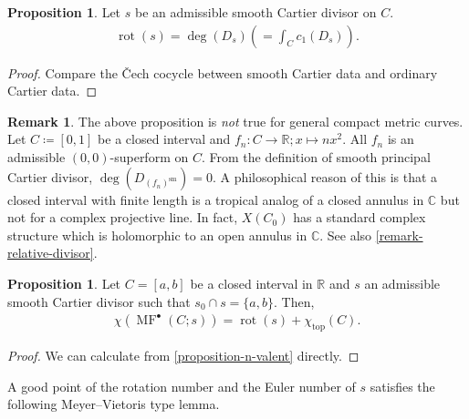 \documentclass[a4paper,dvipdfmx,reqno,12pt]{amsart}
\theoremstyle{definition}
\newtheorem{proposition}[theorem]{Proposition}
\newtheorem{remark}[theorem]{Remark}
\newcommand{\deq}{\coloneqq}
\newcommand{\opn}[1]{\operatorname{#1}}
\numberwithin{equation}{section}
\begin{document}
\begin{proposition}
Let $s$ be an admissible smooth Cartier divisor on $C$.
\label{equation-rotation-number}
\begin{align}
\opn{rot}(s)=\opn{deg}(D_s)(=\int_{C} c_1(D_s)).
\end{align}
\end{proposition}

\begin{proof}
Compare the \v{C}ech cocycle between smooth Cartier data and ordinary Cartier data.
\end{proof}

\begin{remark}
\label{remark-rotation-closed-interval} 
The above proposition 
is \emph{not} true for general compact metric curves.
Let $C\deq [0,1]$ be a closed interval
and $f_n\colon C\to \mathbb{R};x \mapsto nx^{2}$.
All $f_n$ is an admissible $(0,0)$-superform on $C$.
From the definition of smooth principal Cartier divisor,
$\opn{deg}(D_{(f_n)^{\mathrm{sm}}})=0$. 
A philosophical reason of this is that
a closed interval with finite length is a tropical
analog of a closed annulus in $\mathbb{C}$ but not for
a complex projective line. In fact, $X(C_0)$ 
has a standard complex structure which is holomorphic to
an open annulus in $\mathbb{C}$.
See also \cref{remark-relative-divisor}.
\end{remark}

\begin{proposition}
Let $C=[a,b]$ be a closed interval in $\mathbb{R}$
and $s$ an admissible smooth Cartier divisor 
such that $s_0\cap s=\{a,b\}$. Then,
\begin{align}
\chi(\opn{MF}^{\bullet}(C;s))=\opn{rot}(s)+
\chi_{\opn{top}}(C).
\end{align}
\end{proposition}
\begin{proof}
We can calculate from 
\cref{proposition-n-valent} directly.
\end{proof}

A good point of the rotation number and the 
Euler number of $s$ satisfies the 
following Meyer--Vietoris type lemma.
\end{document}

